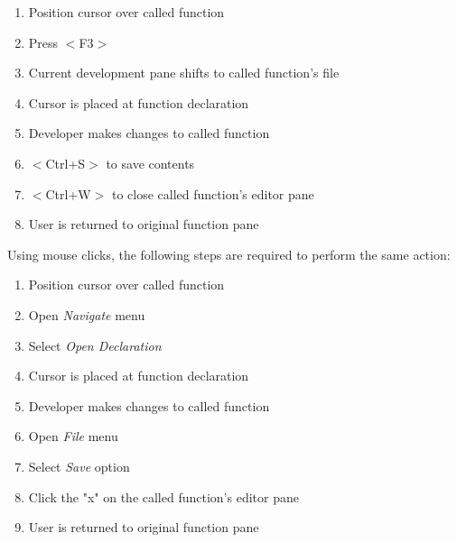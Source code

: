 \documentclass[]{report}
\begin{document}
			\begin{enumerate}
				\item 
				Position cursor over called function
				
				\item
				Press $<$F3$>$
				
				\item 
				Current development pane shifts to called function's file
				
				\item
				Cursor is placed at function declaration
				
				\item 
				Developer makes changes to called function
				
				\item 
				$<$Ctrl+S$>$ to save contents
				
				\item 
				$<$Ctrl+W$>$ to close called function's editor pane
				
				\item 
				User is returned to original function pane
			\end{enumerate}
	
		Using mouse clicks, the following steps are required to perform the same action:
	
			\begin{enumerate}
				\item
				Position cursor over called function
				
				\item 
				Open \textit{Navigate} menu
				
				\item
				Select \textit{Open Declaration}
				
				\item
				Cursor is placed at function declaration
				
				\item 
				Developer makes changes to called function
				
				\item 
				Open \textit{File} menu
				
				\item
				Select \textit{Save} option
				
				\item 
				Click the "x" on the called function's editor pane
				
				\item 
				User is returned to original function pane
			\end{enumerate}
\end{document}
